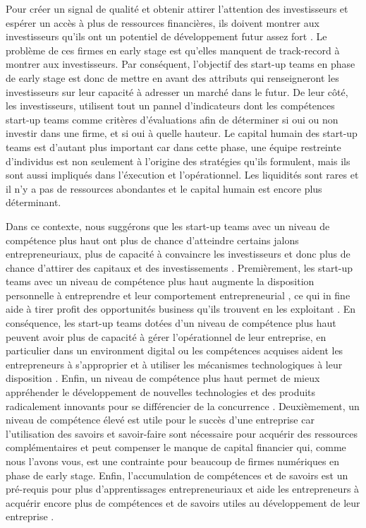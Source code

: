 \documentclass[12pt]{article}
\begin{document}
Pour créer un signal de qualité et obtenir attirer l'attention des investisseurs et espérer un accès à plus de ressources financières, ils doivent montrer aux investisseurs qu'ils ont un potentiel de développement futur assez fort \citep{colombo2021use}. Le problème de ces firmes en early stage est qu'elles manquent de track-record à montrer aux investisseurs. Par conséquent, l'objectif des start-up teams en phase de early stage est donc de mettre en avant des attributs qui renseigneront les investisseurs sur leur capacité à adresser un marché dans le futur. De leur côté, les investisseurs, utilisent tout un pannel d'indicateurs dont les compétences start-up teams comme critères d'évaluations afin de déterminer si oui ou non investir dans une firme, et si oui à quelle hauteur. Le capital humain des start-up teams est d'autant plus important car dans cette phase, une équipe restreinte d'individus est non seulement à l'origine des stratégies qu'ils formulent, mais ils sont aussi impliqués dans l'éxecution et l'opérationnel. Les liquidités sont rares et il n'y a pas de ressources abondantes et le capital humain est encore plus déterminant.

Dans ce contexte, nous suggérons que les start-up teams avec un niveau de compétence plus haut ont plus de chance d'atteindre certains jalons entrepreneuriaux, plus de capacité à convaincre les investisseurs et donc plus de chance d'attirer des capitaux et des investissements \citep{zarutskie2010role}. Premièrement, les start-up teams avec un niveau de compétence plus haut augmente la disposition personnelle à entreprendre et leur comportement entrepreneurial \citep{becherer1999proactive}, ce qui in fine aide à tirer profit des opportunités business qu'ils trouvent en les exploitant \citep{shane2000promise, chandler1994founder}. En conséquence, les start-up teams dotées d'un niveau de compétence plus haut peuvent avoir plus de capacité à gérer l'opérationnel de leur entreprise, en particulier dans un environment digital ou les compétences acquises aident les entrepreneurs à s'approprier et à utiliser les mécanismes technologiques à leur disposition \citep{nambisan2017digital}. Enfin, un niveau de compétence plus haut permet de mieux appréhender le développement de nouvelles technologies et des produits radicalement innovants pour se différencier de la concurrence \citep{marvel2007technology}. Deuxièmement, un niveau de compétence élevé est utile pour le succès d'une entreprise car l'utilisation des savoirs et savoir-faire sont nécessaire pour acquérir des ressources complémentaires et peut compenser le manque de capital financier qui, comme nous l'avons vous, est une contrainte pour beaucoup de firmes numériques en phase de early stage. Enfin, l'accumulation de compétences et de savoirs est un pré-requis pour plus d'apprentissages entrepreneuriaux et aide les entrepreneurs à acquérir encore plus de compétences et de savoirs utiles au développement de leur entreprise \citep{hunter1986cognitive}.
\end{document}
